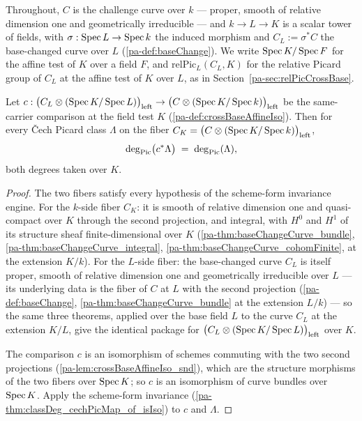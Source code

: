 Throughout, \(C\) is the challenge curve over \(k\) --- proper, smooth of relative
dimension one and geometrically irreducible --- and \(k \to L \to K\) is a scalar
tower of fields, with \(\sigma : \operatorname{Spec} L \to \operatorname{Spec} k\) the induced morphism and
\(C_L := \sigma^{*}C\) the base-changed curve over \(L\) (\ref{pa-def:baseChange}). We
write \(\operatorname{Spec} K/\operatorname{Spec} F\) for the affine test of \(K\) over a field \(F\), and
\(\mathrm{relPic}_L(C_L, K)\) for the relative Picard group of \(C_L\) at the affine
test of \(K\) over \(L\), as in Section~\ref{pa-sec:relPicCrossBase}.

\begin{theorem}
  \label{pa-thm:classDeg_cechPicMap_crossBaseAffineIso}
  \leanok

  Let \(c : \bigl(C_L \otimes (\operatorname{Spec} K/\operatorname{Spec} L)\bigr)_{\mathrm{left}} \to
  \bigl(C \otimes (\operatorname{Spec} K/\operatorname{Spec} k)\bigr)_{\mathrm{left}}\) be the same-carrier
  comparison at the field test \(K\) (\ref{pa-def:crossBaseAffineIso}). Then for every
  \v Cech Picard class \(\Lambda\) on the fiber
  \(C_K = \bigl(C \otimes (\operatorname{Spec} K/\operatorname{Spec} k)\bigr)_{\mathrm{left}}\),
  \[
    \deg_{\operatorname{Pic}}\bigl(c^{*}\Lambda\bigr) \;=\; \deg_{\operatorname{Pic}}(\Lambda),
  \]
  both degrees taken over \(K\).
\end{theorem}
\begin{proof}
  \leanok
  The two fibers satisfy every hypothesis of the scheme-form invariance engine. For
  the \(k\)-side fiber \(C_K\): it is smooth of relative dimension one and
  quasi-compact over \(K\) through the second projection, and integral, with \(H^0\)
  and \(H^1\) of its structure sheaf finite-dimensional over \(K\)
  (\ref{pa-thm:baseChangeCurve_bundle}, \ref{pa-thm:baseChangeCurve_integral},
  \ref{pa-thm:baseChangeCurve_cohomFinite}, at the extension \(K/k\)). For the
  \(L\)-side fiber: the base-changed curve \(C_L\) is itself proper, smooth of
  relative dimension one and geometrically irreducible over \(L\) --- its underlying
  data is the fiber of \(C\) at \(L\) with the second projection
  (\ref{pa-def:baseChange}, \ref{pa-thm:baseChangeCurve_bundle} at the extension
  \(L/k\)) --- so the same three theorems, applied over the base field \(L\) to the
  curve \(C_L\) at the extension \(K/L\), give the identical package for
  \(\bigl(C_L \otimes (\operatorname{Spec} K/\operatorname{Spec} L)\bigr)_{\mathrm{left}}\) over \(K\).

  The comparison \(c\) is an isomorphism of schemes commuting with the two second
  projections (\ref{pa-lem:crossBaseAffineIso_snd}), which are the structure morphisms
  of the two fibers over \(\operatorname{Spec} K\); so \(c\) is an isomorphism of curve bundles
  over \(\operatorname{Spec} K\). Apply the scheme-form invariance
  (\ref{pa-thm:classDeg_cechPicMap_of_isIso}) to \(c\) and \(\Lambda\).
\end{proof}

